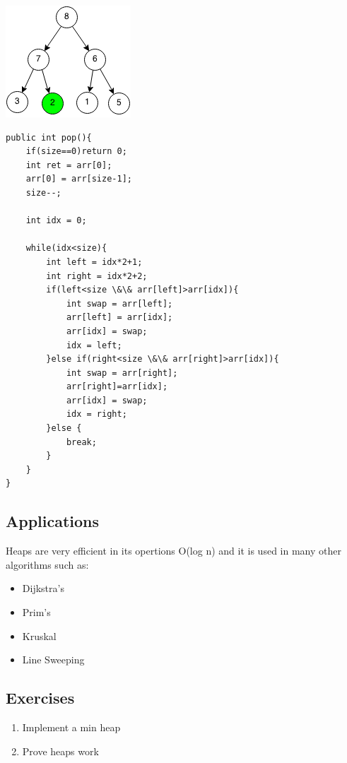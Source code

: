 \documentclass[11pt,oneside]{book}
\makeatletter
\def\maxwidth#1{\ifdim\Gin@nat@width>#1 #1\else\Gin@nat@width\fi}
\makeatother
\begin{document}
\includegraphics[width=\maxwidth{\textwidth}]{maxheappop3.png}

\begin{lstlisting}
public int pop(){
    if(size==0)return 0;
    int ret = arr[0];
    arr[0] = arr[size-1];
    size--;
        
    int idx = 0;
        
    while(idx<size){
        int left = idx*2+1;
        int right = idx*2+2;
        if(left<size \&\& arr[left]>arr[idx]){
            int swap = arr[left];
            arr[left] = arr[idx];
            arr[idx] = swap;
            idx = left;
        }else if(right<size \&\& arr[right]>arr[idx]){
            int swap = arr[right];
            arr[right]=arr[idx];
            arr[idx] = swap;
            idx = right;
        }else {
            break;
        }
    }
}
\end{lstlisting}

\subsection{Applications}

Heaps are very efficient in its opertions O(log n) and it is used in many other algorithms such as:

\begin{itemize}
\item Dijkstra's
\item Prim's
\item Kruskal
\item Line Sweeping
\end{itemize}

\subsection{Exercises}

\begin{enumerate}
\item Implement a min heap
\item Prove heaps work
\end{enumerate}
\end{document}

